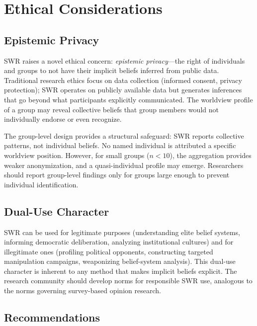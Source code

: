 \documentclass[11pt,a4paper]{article}
\begin{document}
\section{Ethical Considerations}
\label{sec:ethics}

\subsection{Epistemic Privacy}

SWR raises a novel ethical concern: \emph{epistemic privacy}---the right of individuals and groups to not have their implicit beliefs inferred from public data. Traditional research ethics focus on data collection (informed consent, privacy protection); SWR operates on publicly available data but generates inferences that go beyond what participants explicitly communicated. The worldview profile of a group may reveal collective beliefs that group members would not individually endorse or even recognize.

The group-level design provides a structural safeguard: SWR reports collective patterns, not individual beliefs. No named individual is attributed a specific worldview position. However, for small groups ($n < 10$), the aggregation provides weaker anonymization, and a quasi-individual profile may emerge. Researchers should report group-level findings only for groups large enough to prevent individual identification.

\subsection{Dual-Use Character}

SWR can be used for legitimate purposes (understanding elite belief systems, informing democratic deliberation, analyzing institutional cultures) and for illegitimate ones (profiling political opponents, constructing targeted manipulation campaigns, weaponizing belief-system analysis). This dual-use character is inherent to any method that makes implicit beliefs explicit. The research community should develop norms for responsible SWR use, analogous to the norms governing survey-based opinion research.

\subsection{Recommendations}
\end{document}
